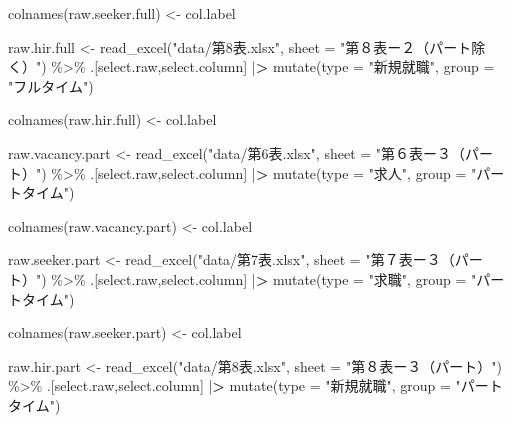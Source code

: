 \documentclass[
]{book}
\newenvironment{Shaded}{\begin{snugshade}}{\end{snugshade}}
\newcommand{\AttributeTok}[1]{\textcolor[rgb]{0.77,0.63,0.00}{#1}}
\newcommand{\ErrorTok}[1]{\textcolor[rgb]{0.64,0.00,0.00}{\textbf{#1}}}
\newcommand{\FunctionTok}[1]{\textcolor[rgb]{0.00,0.00,0.00}{#1}}
\newcommand{\NormalTok}[1]{#1}
\newcommand{\OtherTok}[1]{\textcolor[rgb]{0.56,0.35,0.01}{#1}}
\newcommand{\SpecialCharTok}[1]{\textcolor[rgb]{0.00,0.00,0.00}{#1}}
\newcommand{\StringTok}[1]{\textcolor[rgb]{0.31,0.60,0.02}{#1}}
\begin{document}
\begin{Shaded}
\begin{Highlighting}[]
\FunctionTok{colnames}\NormalTok{(raw.seeker.full) }\OtherTok{\textless{}{-}}\NormalTok{ col.label}

\NormalTok{raw.hir.full }\OtherTok{\textless{}{-}}
  \FunctionTok{read\_excel}\NormalTok{(}\StringTok{"data/第8表.xlsx"}\NormalTok{,}
             \AttributeTok{sheet =} \StringTok{"第８表ー２（パート除く）"}\NormalTok{) }\SpecialCharTok{\%\textgreater{}\%}
\NormalTok{  .[select.raw,select.column] }\SpecialCharTok{|}\ErrorTok{\textgreater{}} 
  \FunctionTok{mutate}\NormalTok{(}\AttributeTok{type =} \StringTok{"新規就職"}\NormalTok{,}
         \AttributeTok{group =} \StringTok{"フルタイム"}\NormalTok{)}

\FunctionTok{colnames}\NormalTok{(raw.hir.full) }\OtherTok{\textless{}{-}}\NormalTok{ col.label}


\NormalTok{raw.vacancy.part }\OtherTok{\textless{}{-}}
  \FunctionTok{read\_excel}\NormalTok{(}\StringTok{"data/第6表.xlsx"}\NormalTok{,}
             \AttributeTok{sheet =} \StringTok{"第６表ー３（パート）"}\NormalTok{) }\SpecialCharTok{\%\textgreater{}\%}
\NormalTok{  .[select.raw,select.column] }\SpecialCharTok{|}\ErrorTok{\textgreater{}} 
  \FunctionTok{mutate}\NormalTok{(}\AttributeTok{type =} \StringTok{"求人"}\NormalTok{,}
         \AttributeTok{group =} \StringTok{"パートタイム"}\NormalTok{)}

\FunctionTok{colnames}\NormalTok{(raw.vacancy.part) }\OtherTok{\textless{}{-}}\NormalTok{ col.label}

\NormalTok{raw.seeker.part }\OtherTok{\textless{}{-}}
  \FunctionTok{read\_excel}\NormalTok{(}\StringTok{"data/第7表.xlsx"}\NormalTok{,}
             \AttributeTok{sheet =} \StringTok{"第７表ー３（パート）"}\NormalTok{)  }\SpecialCharTok{\%\textgreater{}\%}
\NormalTok{  .[select.raw,select.column] }\SpecialCharTok{|}\ErrorTok{\textgreater{}} 
  \FunctionTok{mutate}\NormalTok{(}\AttributeTok{type =} \StringTok{"求職"}\NormalTok{,}
         \AttributeTok{group =} \StringTok{"パートタイム"}\NormalTok{)}

\FunctionTok{colnames}\NormalTok{(raw.seeker.part) }\OtherTok{\textless{}{-}}\NormalTok{ col.label}

\NormalTok{raw.hir.part }\OtherTok{\textless{}{-}}
  \FunctionTok{read\_excel}\NormalTok{(}\StringTok{"data/第8表.xlsx"}\NormalTok{,}
             \AttributeTok{sheet =} \StringTok{"第８表ー３（パート）"}\NormalTok{) }\SpecialCharTok{\%\textgreater{}\%}
\NormalTok{  .[select.raw,select.column] }\SpecialCharTok{|}\ErrorTok{\textgreater{}} 
  \FunctionTok{mutate}\NormalTok{(}\AttributeTok{type =} \StringTok{"新規就職"}\NormalTok{,}
         \AttributeTok{group =} \StringTok{"パートタイム"}\NormalTok{)}


\end{Highlighting}
\end{Shaded}
\end{document}
